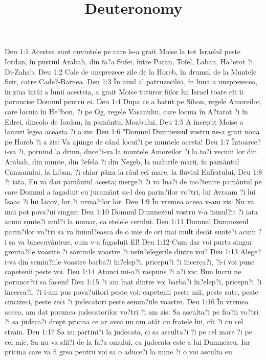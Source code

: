 

\title{Deuteronomy}

Deu 1:1  Acestea sunt cuvintele pe care le-a grait Moise la tot Israelul peste Iordan, în pustiul Arabah, din fa?a Sufei, între Paran, Tofel, Laban, Ha?erot ?i Di-Zahab,
Deu 1:2  Cale de unsprezece zile de la Horeb, în drumul de la Muntele Seir, catre Cade?-Barnea.
Deu 1:3  În anul al patruzecilea, în luna a unsprezecea, în ziua întâi a lunii acesteia, a grait Moise tuturor fiilor lui Israel toate cît îi poruncise Domnul pentru ei.
Deu 1:4  Dupa ce a batut pe Sihon, regele Amoreilor, care locuia în He?bon, ?i pe Og, regele Vasanului, care locuia în A?tarot ?i în Edrei, dincolo de Iordan, în pamântul Moabului,
Deu 1:5  A început Moise a lamuri legea aceasta ?i a zis:
Deu 1:6  "Domnul Dumnezeul vostru ne-a grait noua pe Horeb ?i a zis: Va ajunge de când locui?i pe muntele acesta!
Deu 1:7  Întoarce?i-va ?i, pornind la drum, duce?i-va la muntele Amoreilor ?i la to?i vecinii lor din Arabah, din munte, din ?efela ?i din Negeb, la malurile marii, în pamântul Canaanului, la Liban, ?i chiar pâna la râul cel mare, la fluviul Eufratului.
Deu 1:8  ?i iata, Eu va dau pamântul acesta; merge?i ?i va lua?i de mo?tenire pamântul pe care Domnul a fagaduit cu juramânt sa-l dea parin?ilor vo?tri, lui Avraam ?i lui Isaac ?i lui Iacov, lor ?i urma?ilor lor.
Deu 1:9  În vremea aceea v-am zis: Nu va mai pot pova?ui singur;
Deu 1:10  Domnul Dumnezeul vostru v-a înmul?it ?i iata acum sunte?i mul?i la numar, ca stelele cerului.
Deu 1:11  Domnul Dumnezeul parin?ilor vo?tri sa va înmul?easca de o mie de ori mai mult decât sunte?i acum ?i sa va binecuvânteze, cum v-a fagaduit El!
Deu 1:12  Cum dar voi purta singur greuta?ile voastre ?i sarcinile voastre ?i neîn?elegerile dintre voi?
Deu 1:13  Alege?i-va din semin?iile voastre barba?i în?elep?i, pricepu?i ?i încerca?i, ?i-i voi pune capetenii peste voi.
Deu 1:14  Atunci mi-a?i raspuns ?i a?i zis: Bun lucru ne porunce?ti sa facem!
Deu 1:15  ?i am luat dintre voi barba?i în?elep?i, pricepu?i ?i încerca?i, ?i i-am pus pova?uitori peste voi: capetenii peste mii, peste sute, peste cincizeci, peste zeci ?i judecatori peste semin?iile voastre.
Deu 1:16  În vremea aceea, am dat porunca judecatorilor vo?tri ?i am zis: Sa asculta?i pe fra?ii vo?tri ?i sa judeca?i drept pricina ce ar avea un om atât cu fratele lui, cît ?i cu cel strain.
Deu 1:17  Sa nu partini?i la judecata, ci sa asculta?i ?i pe cel mare ?i pe cel mic. Sa nu va sfii?i de la fa?a omului, ca judecata este a lui Dumnezeu. Iar pricina care va fi grea pentru voi sa o aduce?i la mine ?i o voi asculta eu.
